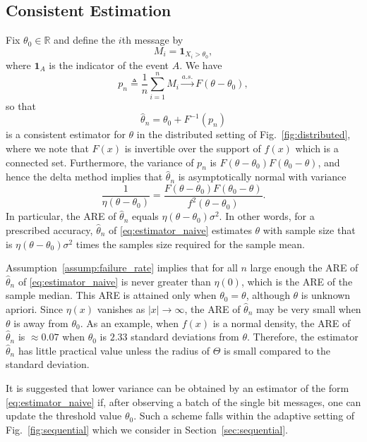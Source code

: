 \documentclass[letterpaper, 11pt]{IEEEtran}      %
\begin{document}
\subsection{Consistent Estimation}
Fix $\theta_0 \in \mathbb R$ and define the $i$th message by 
\[
M_i = \mathbf 1_{X_i>\theta_0}, 
\]
where $\mathbf 1_A$ is the indicator of the event $A$. We have
\[
p_n \triangleq\frac{1}{n} \sum_{i=1}^n M_i \overset{a.s.}{\rightarrow} F(\theta - \theta_0),  
\]
so that 
\begin{equation}
\label{eq:estimator_naive}
\hat{\theta}_n = \theta_0 + F^{-1}\left( p_n \right)
\end{equation}
is a consistent estimator for $\theta$ in the distributed setting of Fig.~\ref{fig:distributed}, where we note that $F(x)$ is invertible over the support of $f(x)$ which is a connected set. Furthermore, the variance of $p_n$ is $F(\theta-\theta_0)F(\theta_0-\theta)$, and hence the delta method implies that $\hat{\theta}_n$ is asymptotically normal with variance 
\begin{equation} 
\frac{1}{
\eta(\theta-\theta_0)} = \frac{F(\theta-\theta_0)F(\theta_0-\theta)}{f^2(\theta-\theta_0)}. 
\end{equation}
In particular, the ARE of $\hat{\theta}_n$ equals $\eta(\theta - \theta_0)\sigma^2$. In other words, for a prescribed accuracy, $\hat{\theta}_n$ of  \eqref{eq:estimator_naive} estimates $\theta$ with sample size that is $\eta(\theta- \theta_0)  \sigma^2$ times the samples size required for the sample mean. \par
%
%
Assumption~\ref{assump:failure_rate} implies that for  all $n$ large enough the ARE of $\hat{\theta}_n$ of \eqref{eq:estimator_naive} is never greater than $\eta(0)$, which is the ARE of the sample median. This ARE is attained only when $\theta_0 = \theta$, although $\theta$ is unknown apriori. Since $\eta(x)$ vanishes as $|x|\rightarrow \infty$, the ARE of $\hat{\theta}_n$ may be very small when $\theta$ is away from $\theta_0$. As an example, when $f(x)$ is a normal density, the ARE of $\hat{\theta}_n$ is $\approx 0.07$ when $\theta_0$ is $2.33$ standard deviations from $\theta$. Therefore, the estimator $\hat{\theta}_n$ has little practical value unless the radius of $\Theta$ is small compared to the standard deviation. \par 
It is suggested that lower variance can be obtained by an estimator of the form \eqref{eq:estimator_naive} if, after observing a batch of the single bit messages, one can update the threshold value $\theta_0$. Such a scheme falls within the adaptive setting of Fig.~\ref{fig:sequential} which we consider in Section~\ref{sec:sequential}. \\
\end{document}
